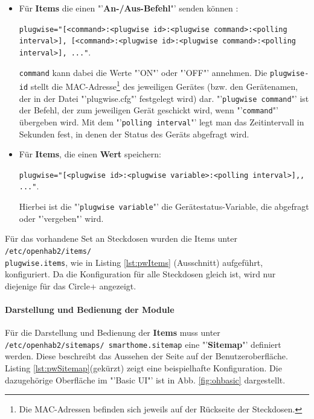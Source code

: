 \begin{itemize}
	\item Für \textbf{Items} die einen "'\textbf{An-/Aus-Befehl}"' senden können :
	
	\texttt{plugwise="[<command>:<plugwise id>:<plugwise command>:<polling \\ interval>], [<command>:<plugwise id>:<plugwise command>:<polling
		\\ interval>], ..."}. 
	
	\texttt{command} kann dabei die Werte "'ON"' oder "'OFF"' annehmen.
	Die \texttt{plugwise-id} stellt die MAC-Adresse\footnote{Die MAC-Adressen befinden sich jeweils auf der Rückseite der Steckdosen.} des jeweiligen Gerätes (bzw. den Gerätenamen, der in der Datei "'plugwise.cfg"' festgelegt wird) dar. "'\texttt{plugwise command}"' ist der Befehl, der zum jeweiligen Gerät geschickt wird, wenn "'\texttt{command}"' übergeben wird. Mit dem "'\texttt{polling interval}"' legt man das Zeitintervall in Sekunden fest, in denen der Status des Geräts abgefragt wird.
	
	
	\item Für \textbf{Items}, die einen \textbf{Wert} speichern:
	
	\texttt{plugwise="[<plugwise id>:<plugwise variable>:<polling interval>],, ..."}. 
	
	Hierbei ist die "'\texttt{plugwise variable}"' die Gerätestatus-Variable, die abgefragt oder "'vergeben"' wird.
	
\end{itemize}

Für das vorhandene Set an Steckdosen wurden die Items unter \texttt{/etc/openhab2/items/\\plugwise.items}, wie in Listing \ref{lst:pwItems} (Ausschnitt) aufgeführt, konfiguriert. Da die Konfiguration für alle Steckdosen gleich ist, wird nur diejenige für das Circle+ angezeigt.



\newpage

\paragraph{Darstellung und Bedienung der Module}

Für die Darstellung und Bedienung der \textbf{Items} muss unter \texttt{/etc/openhab2/sitemaps/\mbox{} smarthome.sitemap} eine "'\textbf{Sitemap}"' definiert werden. Diese beschreibt das Aussehen der Seite auf der Benutzeroberfläche. Listing \ref{lst:pwSitemap}(gekürzt) zeigt eine beispielhafte Konfiguration. Die dazugehörige Oberfläche im "'Basic UI"' ist in Abb. \ref{fig:ohbasic} dargestellt.\newline



